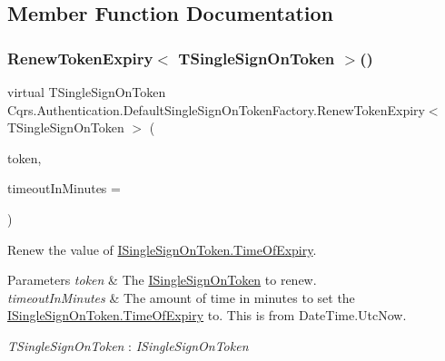 \subsection{Member Function Documentation}
\mbox{\label{classCqrs_1_1Authentication_1_1DefaultSingleSignOnTokenFactory_a1bb480afd0a467461b0db59da641fe29_a1bb480afd0a467461b0db59da641fe29}} 
\subsubsection{\texorpdfstring{Renew\+Token\+Expiry$<$ T\+Single\+Sign\+On\+Token $>$()}{RenewTokenExpiry< TSingleSignOnToken >()}}
{\footnotesize\ttfamily virtual T\+Single\+Sign\+On\+Token Cqrs.\+Authentication.\+Default\+Single\+Sign\+On\+Token\+Factory.\+Renew\+Token\+Expiry$<$ T\+Single\+Sign\+On\+Token $>$ (\begin{DoxyParamCaption}\item[{T\+Single\+Sign\+On\+Token}]{token,  }\item[{int}]{timeout\+In\+Minutes = {} }\end{DoxyParamCaption})\hspace{0.3cm}{\ttfamily [virtual]}}



Renew the value of \hyperlink{interfaceCqrs_1_1Authentication_1_1ISingleSignOnToken_a50af484569cc78f88acb01f1938a7cd8_a50af484569cc78f88acb01f1938a7cd8}{I\+Single\+Sign\+On\+Token.\+Time\+Of\+Expiry}. 


\begin{DoxyParams}{Parameters}
{\em token} & The \hyperlink{interfaceCqrs_1_1Authentication_1_1ISingleSignOnToken}{I\+Single\+Sign\+On\+Token} to renew.\\
\hline
{\em timeout\+In\+Minutes} & The amount of time in minutes to set the \hyperlink{interfaceCqrs_1_1Authentication_1_1ISingleSignOnToken_a50af484569cc78f88acb01f1938a7cd8_a50af484569cc78f88acb01f1938a7cd8}{I\+Single\+Sign\+On\+Token.\+Time\+Of\+Expiry} to. This is from Date\+Time.\+Utc\+Now.\\
\hline
\end{DoxyParams}
\begin{Desc}
\item[Type Constraints]\begin{description}
\item[{\em T\+Single\+Sign\+On\+Token} : {\em I\+Single\+Sign\+On\+Token}]\end{description}
\end{Desc}
